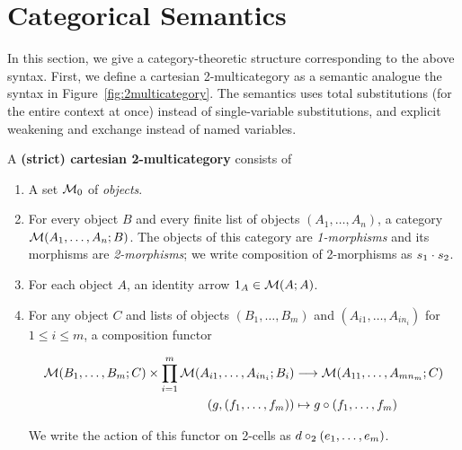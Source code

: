 \newcommand\cD{\ensuremath{\mathcal{D}}}

\section{Categorical Semantics}

In this section, we give a category-theoretic structure corresponding to
the above syntax.  First, we define a cartesian 2-multicategory as a
semantic analogue the syntax in Figure~\ref{fig:2multicategory}. The
semantics uses total substitutions (for the entire context at once)
instead of single-variable substitutions, and explicit weakening and
exchange instead of named variables.

\begin{definition}
  A \textbf{(strict) cartesian 2-multicategory} consists of
  \begin{enumerate}
  \item A set $\mathcal{M}_0$ of \emph{objects}.
  \item For every object $B$ and every finite list of objects $(A_1,\dots,A_n)$, a category $\mathcal{M}(A_1,\dots,A_n;B)$.
    The objects of this category are \emph{1-morphisms} and its morphisms are \emph{2-morphisms}; we write composition of 2-morphisms as $s_1 \cdot s_2$.
  \item For each object $A$, an identity arrow $1_A\in\mathcal{M}(A;A)$.
  \item For any object $C$ and lists of objects $(B_1,\dots,B_m)$ and $(A_{i1},\dots,A_{in_i})$ for $1\le i\le m$, a composition functor
    \begin{footnotesize}
    \begin{align*}
      \mathcal{M}(B_1,\dots,B_m;C) \times \prod_{i=1}^m \mathcal{M}(A_{i1},\dots,A_{in_i};B_i) &\longrightarrow \mathcal{M}(A_{11},\dots,A_{mn_m};C)\\
      (g,(f_1,\dots,f_m)) &\mapsto g\circ (f_1,\dots,f_m)
    \end{align*}
    \end{footnotesize}
    We write the action of this functor on 2-cells as $d \mathbin{\circ_2} (e_1,\dots,e_m)$.

\end{enumerate}
\end{definition}
